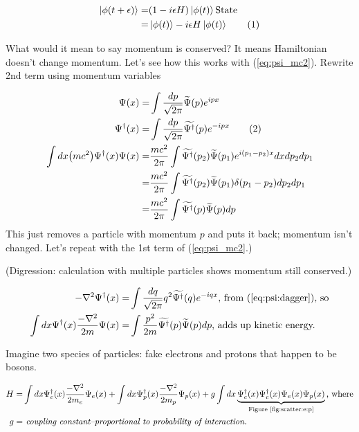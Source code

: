 \documentclass[]{article}
\newcommand\numberthis{\addtocounter{equation}{1}\tag{\theequation}}
\begin{document}
\begin{align*}
\ket{\phi(t+\epsilon)} =& (1-i \epsilon H) \ket{\phi(t)} \text{State}\\
=& \ket{\phi(t)} -i \epsilon H \ket{\phi(t)} \numberthis \label{eq:update:state}
\end{align*}

What would it mean to say momentum is conserved? It means Hamiltonian doesn't change momentum. Let's see how this works with (\ref{eq:psi_mc2}). Rewrite 2nd term  using momentum variables

\begin{align*}
\Psi(x) =& \int \frac{dp}{\sqrt{2\pi}} \widetilde{\Psi}(p) e^{ipx}\\
\Psi^\dagger (x) =& \int \frac{dp}{\sqrt{2\pi}} \widetilde{\Psi^\dagger}(p) e^{-ipx} \numberthis \label{eq:psi:dagger}\\
\int dx \big(mc^2\big) \Psi^\dagger(x) \Psi(x) =& \frac{mc^2}{2 \pi} \int \widetilde{\Psi^\dagger}(p_2) \widetilde{\Psi}(p_1) e^{i(p_1-p_2)x} dx dp_2 dp_1\\
=& \frac{mc^2}{2 \pi} \int \widetilde{\Psi^\dagger}(p_2) \widetilde{\Psi}(p_1) \delta(p_1-p_2) dp_2 dp_1\\
=& \frac{mc^2}{2 \pi} \int \widetilde{\Psi^\dagger}(p) \widetilde{\Psi}(p) dp
\end{align*}
This just removes a particle with momentum $p$ and puts it back; momentum isn't changed. Let's repeat with the 1st term of (\ref{eq:psi_mc2}.)

(Digression: calculation with multiple particles shows momentum still conserved.)

\begin{align*}
- \nabla^2 \Psi^\dagger (x) =& \int \frac{dq}{\sqrt{2\pi}} q^2 \widetilde{\Psi^\dagger}(q) e^{-iqx}\text{, from (\ref{eq:psi:dagger}), so}\\
\int dx \Psi^\dagger(x) \frac{- \nabla^2}{2m} \Psi(x)=& \int \frac{ p^2}{2m} \widetilde{\Psi^\dagger}(p) \widetilde{\Psi}(p) dp \text{, adds up kinetic energy.}
\end{align*}

Imagine two species of particles: fake electrons and protons that happen to be bosons.

\begin{align*}
H =& \int dx  \Psi^\dagger_e(x) \frac{- \nabla^2}{2m_e} \Psi_e(x) + \int dx \Psi^\dagger_p(x) \frac{- \nabla^2}{2m_p} \Psi_p(x)  + g \int dx \underbrace{\Psi^\dagger_e(x) \Psi^\dagger_e(x) \Psi_e(x) \Psi_p(x)}_\text{Figure \ref{fig:scatter:e:p}} \text{, where}\\
g=& \textit{ coupling constant--proportional to probability of interaction.}
\end{align*}
\end{document}
